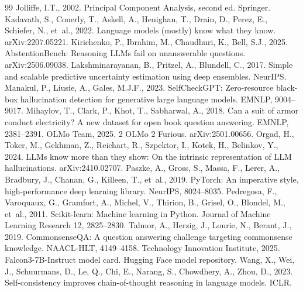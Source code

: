 \documentclass[preprint,12pt,authoryear]{elsarticle}
\begin{document}
\begin{thebibliography}{99}
 Jolliffe, I.T., 2002. Principal Component Analysis, second ed. Springer.
 Kadavath, S., Conerly, T., Askell, A., Henighan, T., Drain, D., Perez, E., Schiefer, N., et~al., 2022. Language models (mostly) know what they know. arXiv:2207.05221.
 Kirichenko, P., Ibrahim, M., Chaudhuri, K., Bell, S.J., 2025. AbstentionBench: Reasoning LLMs fail on unanswerable questions. arXiv:2506.09038.
 Lakshminarayanan, B., Pritzel, A., Blundell, C., 2017. Simple and scalable predictive uncertainty estimation using deep ensembles. NeurIPS.
 Manakul, P., Liusie, A., Gales, M.J.F., 2023. SelfCheckGPT: Zero-resource black-box hallucination detection for generative large language models. EMNLP, 9004--9017.
 Mihaylov, T., Clark, P., Khot, T., Sabharwal, A., 2018. Can a suit of armor conduct electricity? A new dataset for open book question answering. EMNLP, 2381--2391.
 OLMo Team, 2025. 2 OLMo 2 Furious. arXiv:2501.00656.
 Orgad, H., Toker, M., Gekhman, Z., Reichart, R., Szpektor, I., Kotek, H., Belinkov, Y., 2024. LLMs know more than they show: On the intrinsic representation of LLM hallucinations. arXiv:2410.02707.
 Paszke, A., Gross, S., Massa, F., Lerer, A., Bradbury, J., Chanan, G., Killeen, T., et~al., 2019. PyTorch: An imperative style, high-performance deep learning library. NeurIPS, 8024--8035.
 Pedregosa, F., Varoquaux, G., Gramfort, A., Michel, V., Thirion, B., Grisel, O., Blondel, M., et~al., 2011. Scikit-learn: Machine learning in Python. Journal of Machine Learning Research 12, 2825--2830.
 Talmor, A., Herzig, J., Lourie, N., Berant, J., 2019. CommonsenseQA: A question answering challenge targeting commonsense knowledge. NAACL-HLT, 4149--4158.
 Technology Innovation Institute, 2025. Falcon3-7B-Instruct model card. Hugging Face model repository.
 Wang, X., Wei, J., Schuurmans, D., Le, Q., Chi, E., Narang, S., Chowdhery, A., Zhou, D., 2023. Self-consistency improves chain-of-thought reasoning in language models. ICLR.

\end{thebibliography}
\end{document}
